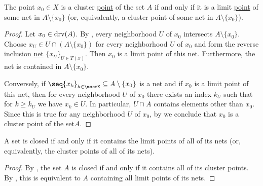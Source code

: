 \begin{proposition}\label{thm:cluster_point_of_set_iff_limit_point_of_net}
  The point \( x_0 \in X \) is a cluster \hyperref[def:cluster_point]{point} of the set \( A \) if and only if it is a limit \hyperref[def:net_convergence/cluster]{point} of some net in \( A \setminus \{ x_0 \} \) (or, equivalently, a cluster point of some net in \( A \setminus \{ x_0 \} \)).
\end{proposition}
\begin{proof}
  \SufficiencySubProof Let \( x_0 \in \operatorname{drv}(A) \). By , every neighborhood \( U \) of \( x_0 \) intersects \( A \setminus \{ x_0 \} \). Choose \( x_U \in U \cap (A \setminus \{ x_0 \}) \) for every neighborhood \( U \) of \( x_0 \) and form the reverse inclusion \hyperref[ex:reverse_inclusion_net]{net} \( \{ x_U \}_{U \in T(x)} \). Then \( x_0 \) is a limit point of this net. Furthermore, the net is contained in \( A \setminus \{ x_0 \} \).

  \NecessitySubProof Conversely, if \( \seq{ x_k }_{k \in \mscrK} \subseteq A \setminus \{ x_0 \} \) is a net and if \( x_0 \) is a limit point of this net, then for every neighborhood \( U \) of \( x_0 \) there exists an index \( k_U \) such that for \( k \geq k_U \) we have \(  x_k \in U \). In particular, \( U \cap A \) contains elements other than \( x_0 \). Since this is true for any neighborhood \( U \) of \( x_0 \), by  we conclude that \( x_0 \) is a cluster point of the set\( A \).
\end{proof}

\begin{corollary}\label{thm:closed_iff_contains_all_net_cluster_points}
  A set is closed if and only if it contains the limit points of all of its nets (or, equivalently, the cluster points of all of its nets).
\end{corollary}
\begin{proof}
  By , the set \( A \) is closed if and only if it contains all of its cluster points. By , this is equivalent to \( A \) containing all limit points of its nets.
\end{proof}

